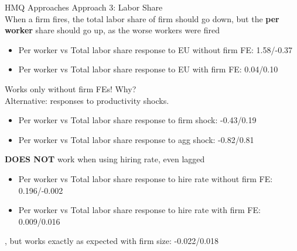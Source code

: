 \documentclass[9pt,aspectratio=169]{beamer} %
\begin{document}
\begin{frame}[noframenumbering]{HMQ Approaches}
Approach 3: Labor Share \\
When a firm fires, the total labor share of firm should go down, but the \textbf{per worker} share should go up, as the worse workers were fired \\
\begin{itemize}
    \item Per worker vs Total labor share response to EU without firm FE: 1.58/-0.37         
    \item Per worker vs Total labor share response to EU with firm FE: 0.04/0.10
\end{itemize}
Works only without firm FEs! Why? \\
Alternative: responses to productivity shocks.
\begin{itemize}
    \item Per worker vs Total labor share response to firm shock: -0.43/0.19
    \item Per worker vs Total labor share response to agg shock: -0.82/0.81
\end{itemize}
\textbf{DOES NOT} work when using hiring rate, even lagged
\begin{itemize}
    \item Per worker vs Total labor share response to hire rate without firm FE: 0.196/-0.002
    \item Per worker vs Total labor share response to hire rate with firm FE: 0.009/0.016
\end{itemize}
, but works exactly as expected with firm size: -0.022/0.018 \hyperlink{Param}{}
\end{frame}
\end{document}
